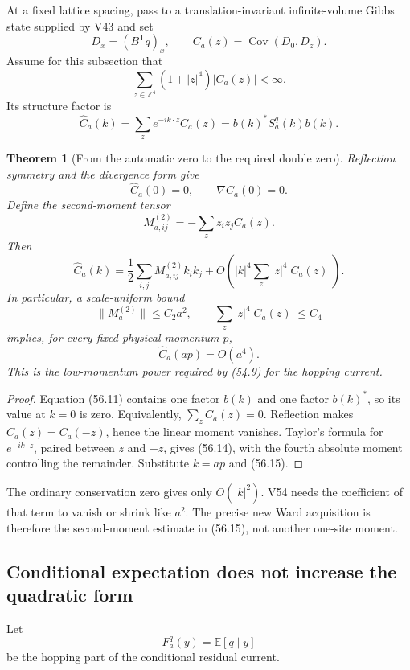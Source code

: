 \documentclass[11pt]{article}
\newtheorem{theorem}{Theorem}[section]
\theoremstyle{remark}
\begin{document}
At a fixed lattice spacing, pass to a translation-invariant
infinite-volume Gibbs state supplied by V43 and set
\[
 D_x=(B^{\mathsf T}q)_x,\qquad
 C_a(z)=\operatorname{Cov}(D_0,D_z).              \tag{56.9}
\]
Assume for this subsection that
\[
 \sum_{z\in\mathbb Z^4}(1+|z|^4)|C_a(z)|<\infty. \tag{56.10}
\]
Its structure factor is
\[
 \widehat C_a(k)=\sum_ze^{-ik\cdot z}C_a(z)
 =b(k)^*S_a^q(k)b(k).                             \tag{56.11}
\]

\begin{theorem}[From the automatic zero to the required double zero]
\label{thm:v17v56-sumrule}
Reflection symmetry and the divergence form give
\[
 \widehat C_a(0)=0,\qquad
 \nabla\widehat C_a(0)=0.                         \tag{56.12}
\]
Define the second-moment tensor
\[
 M_{a,ij}^{(2)}
 =
 -\sum_z z_iz_jC_a(z).                            \tag{56.13}
\]
Then
\[
 \widehat C_a(k)
 =
 \frac12\sum_{i,j}M_{a,ij}^{(2)}k_ik_j
 +O\left(
 |k|^4\sum_z|z|^4|C_a(z)|
 \right).                                        \tag{56.14}
\]
In particular, a scale-uniform bound
\[
 \|M_a^{(2)}\|\leq C_2a^2,\qquad
 \sum_z|z|^4|C_a(z)|\leq C_4                      \tag{56.15}
\]
implies, for every fixed physical momentum \(p\),
\[
 \widehat C_a(ap)=O(a^4).                         \tag{56.16}
\]
This is the low-momentum power required by (54.9) for the hopping
current.
\end{theorem}

\begin{proof}
Equation (56.11) contains one factor \(b(k)\) and one factor
\(b(k)^*\), so its value at \(k=0\) is zero.  Equivalently,
\(\sum_zC_a(z)=0\).  Reflection makes \(C_a(z)=C_a(-z)\), hence the
linear moment vanishes.  Taylor's formula for \(e^{-ik\cdot z}\),
paired between \(z\) and \(-z\), gives (56.14), with the fourth
absolute moment controlling the remainder.  Substitute \(k=ap\) and
(56.15).
\end{proof}

The ordinary conservation zero gives only \(O(|k|^2)\).  V54 needs
the coefficient of that term to vanish or shrink like \(a^2\).  The
precise new Ward acquisition is therefore the second-moment estimate
in (56.15), not another one-site moment.

\subsection{Conditional expectation does not increase the quadratic
form}

Let
\[
 F_a^q(y)=\mathbb E[q\mid y]                      \tag{56.17}
\]
be the hopping part of the conditional residual current.
\end{document}

